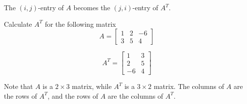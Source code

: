 \documentclass{ximera}
\begin{document}
The $( i, j)$-entry of $A$ becomes the 
$( j,i)$-entry of $A^T$. 



\begin{example}\label{ex:transposematrix}
Calculate $A^T$ for the following matrix
\begin{equation*}
A =
\begin{bmatrix}
1 & 2 & -6 \\
3 & 5 & 4
\end{bmatrix}
\end{equation*}
\begin{explanation}

\begin{equation*}
A^T = 
\begin{bmatrix}
1 & 3 \\
2 & 5 \\
-6 & 4
\end{bmatrix}
\end{equation*}

Note that $A$ is a $2 \times 3$ matrix, while $A^T$ is a $3 \times 2$ matrix. The columns of $A$ are the rows of $A^T$, and the rows of $A$ are the columns of $A^T$.
\end{explanation}
\end{example}
\end{document}
